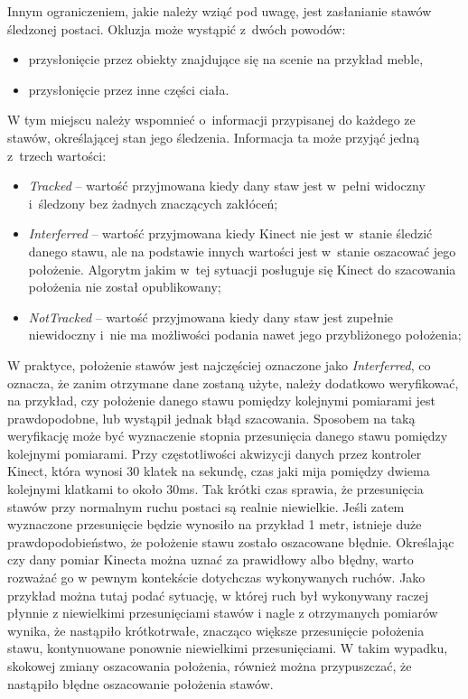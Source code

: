 Innym ograniczeniem, jakie należy wziąć pod uwagę, jest zasłanianie stawów śledzonej postaci. Okluzja może wystąpić z~dwóch powodów:
\begin{itemize}
	\item przysłonięcie przez obiekty znajdujące się na scenie na przykład meble,
	\item przysłonięcie przez inne części ciała.
\end{itemize}
																																			
W tym miejscu należy wspomnieć o~informacji przypisanej do każdego ze stawów, określającej stan jego śledzenia. Informacja ta może przyjąć jedną z~trzech wartości:
\begin{itemize}
	\item \emph{Tracked} -- wartość przyjmowana kiedy dany staw jest w~pełni widoczny i~śledzony bez żadnych znaczących zakłóceń;
	\item \emph{Interferred} -- wartość przyjmowana kiedy Kinect nie jest w~stanie śledzić danego stawu, ale na podstawie innych wartości jest w~stanie oszacować jego położenie. Algorytm jakim w~tej sytuacji posługuje się Kinect do szacowania położenia nie został opublikowany;
	\item \emph{NotTracked} -- wartość przyjmowana kiedy dany staw jest zupełnie niewidoczny i~nie ma możliwości podania nawet jego przybliżonego położenia;
\end{itemize}
																																			
W praktyce, położenie stawów jest najczęściej oznaczone jako \emph{Interferred}, co oznacza, że zanim otrzymane dane zostaną użyte, należy dodatkowo weryfikować, na przykład, czy położenie danego stawu pomiędzy kolejnymi pomiarami jest prawdopodobne, lub wystąpił jednak błąd szacowania. Sposobem na taką weryfikację może być wyznaczenie stopnia przesunięcia danego stawu pomiędzy kolejnymi pomiarami. Przy częstotliwości akwizycji danych przez kontroler Kinect, która wynosi 30 klatek na sekundę, czas jaki mija pomiędzy dwiema kolejnymi klatkami to około 30ms. Tak krótki czas sprawia, że przesunięcia stawów przy normalnym ruchu postaci są realnie niewielkie. Jeśli zatem wyznaczone przesunięcie będzie wynosiło na przykład 1 metr, istnieje duże prawdopodobieństwo, że położenie stawu zostało oszacowane błędnie. Określając czy dany pomiar Kinecta można uznać za prawidłowy albo błędny, warto rozważać go w pewnym kontekście dotychczas wykonywanych ruchów. Jako przykład można tutaj podać sytuację, w której ruch był wykonywany raczej płynnie z niewielkimi przesunięciami stawów i nagle z otrzymanych pomiarów wynika, że nastąpiło krótkotrwałe, znacząco większe przesunięcie położenia stawu, kontynuowane ponownie niewielkimi przesunięciami. W takim wypadku, skokowej zmiany oszacowania położenia, również można przypuszczać, że nastąpiło błędne oszacowanie położenia stawów.
																																			
